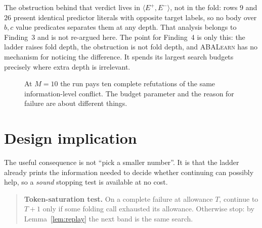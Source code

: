 \documentclass[11pt]{article}
\DeclareRobustCommand{\code}[1]{\texttt{\detokenize{#1}}}
\newcommand{\ABALearn}{\textsc{ABALearn}}
\newcommand{\Epos}{E^{+}}
\newcommand{\Eneg}{E^{-}}
\begin{document}
The obstruction behind that verdict lives in $\langle\Epos,\Eneg\rangle$, not in
the fold: rows $9$ and $26$ present identical predictor literals with opposite
target labels, so no body over $b,c$ value predicates separates them at any
depth. That analysis belongs to Finding~3 and is not re-argued here. The point
for Finding~4 is only this: the ladder raises fold depth, the obstruction is not
fold depth, and \ABALearn{} has no mechanism for noticing the difference. It
spends its largest search budgets precisely where extra depth is irrelevant.

\begin{figure}[ht]
\centering
{}
\caption{At $M=10$ the run pays ten complete refutations of the same
information-level conflict. The budget parameter and the reason for failure are
about different things.}
\label{fig:bands}
\end{figure}

\section{Design implication}
\label{sec:implication}

The useful consequence is not ``pick a smaller number''. It is that the ladder
already prints the information needed to decide whether continuing can possibly
help, so a \emph{sound} stopping test is available at no cost.

\begin{quote}
\textbf{Token-saturation test.} On a complete failure at allowance $T$, continue
to $T+1$ only if some folding call exhausted its allowance. Otherwise stop:
by Lemma~\ref{lem:replay} the next band is the same search.
\end{quote}
\end{document}
